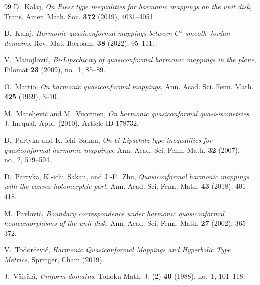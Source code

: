 \documentclass{amsart}
\begin{document}
\begin{thebibliography}{99}
D.~Kalaj,
\newblock \emph{On Riesz type inequalities for harmonic mappings on the unit disk},
\newblock Trans. Amer. Math. Soc. \textbf{372} (2019), 4031--4051.

D.~Kalaj,
\newblock \emph{Harmonic quasiconformal mappings between $C^1$ smooth Jordan domains},
\newblock Rev. Mat. Iberoam. \textbf{38} (2022), 95--111.


V.~Manojlovi\'{c},
\newblock \emph{Bi-Lipschicity of quasiconformal harmonic mappings in the plane},
\newblock Filomat \textbf{23} (2009), no.~1, 85--89.

O.~Martio,
\newblock \emph{On harmonic quasiconformal mappings},
\newblock Ann. Acad. Sci. Fenn. Math. \textbf{425} (1969), 3--10.



M.~Mateljevi\'{c} and M.~Vuorinen,
\newblock \emph{On harmonic quasiconformal quasi-isometries},
\newblock J. Inequal. Appl. (2010), Article ID 178732.

D.~Partyka and K.-ichi~Sakan,
\newblock \emph{On bi-Lipschitz type inequalities for quasiconformal harmonic mappings},
\newblock Ann. Acad. Sci. Fenn. Math. \textbf{32} (2007), no.~2, 579--594.

D.~Partyka, K.-ichi~Sakan, and J.-F.~Zhu,
\newblock \emph{Quasiconformal harmonic mappings with the convex holomorphic part},
\newblock Ann. Acad. Sci. Fenn. Math. \textbf{43} (2018), 401--418.

M.~Pavlovi\'{c},
\newblock \emph{Boundary correspondence under harmonic quasiconformal homeomorphisms of the unit disk},
\newblock Ann. Acad. Sci. Fenn. Math. \textbf{27} (2002), 365--372.

V.~Todor\v{c}evi\'{c},
\newblock \emph{Harmonic Quasiconformal Mappings and Hyperbolic Type Metrics},
\newblock Springer, Cham (2019).

J.~V\"ais\"al\"a,
\newblock \emph{Uniform domains},
\newblock Tohoku Math. J. (2) \textbf{40} (1988), no.~1, 101--118.

\end{thebibliography}
\end{document}
